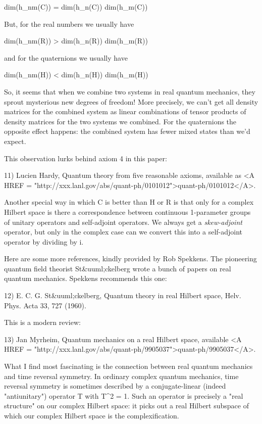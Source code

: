 dim(h_{nm}(C)) = dim(h_{n}(C)) dim(h_{m}(C))

But, for the real numbers we usually have

dim(h_{nm}(R)) > dim(h_{n}(R)) dim(h_{m}(R))

and for the quaternions we usually have

dim(h_{nm}(H)) < dim(h_{n}(H)) dim(h_{m}(H))

So, it seems that when we combine two systems in real quantum
mechanics, they sprout mysterious new degrees of freedom!  More
precisely, we can't get all density matrices for the combined system
as linear combinations of tensor products of density matrices for the
two systems we combined.  For the quaternions the opposite effect
happens: the combined system has fewer mixed states than we'd expect.

This observation lurks behind axiom 4 in this paper:

11) Lucien Hardy, Quantum theory from five reasonable axioms, 
available as <A HREF = "http://xxx.lanl.gov/abs/quant-ph/0101012">quant-ph/0101012</A>.

Another special way in which C is better than H or R is that
only for a complex Hilbert space is there a correspondence between
continuous 1-parameter groups of unitary operators and self-adjoint
operators.  We always get a \emph{skew-adjoint} operator, but only
in the complex case can we convert this into a self-adjoint operator
by dividing by i.  

Here are some more references, kindly provided by Rob Spekkens.  The 
pioneering quantum field theorist St&uuml;ckelberg wrote a bunch of papers 
on real quantum mechanics.  Spekkens recommends this one:

12) E. C. G. St&uuml;ckelberg, Quantum theory in real Hilbert space,
Helv. Phys. Acta 33, 727 (1960).

This is a modern review:

13) Jan Myrheim, Quantum mechanics on a real Hilbert space, available
<A HREF = "http://xxx.lanl.gov/abs/quant-ph/9905037">quant-ph/9905037</A>.

What I find most fascinating is the connection between real quantum
mechanics and time reversal symmetry.  In ordinary complex quantum
mechanics, time reversal symmetry is sometimes described by a
conjugate-linear (indeed "antiunitary") operator T with
T^{2} = 1.  Such an operator is precisely a "real
structure" on our complex Hilbert space: it picks out a real
Hilbert subspace of which our complex Hilbert space is the
complexification.


